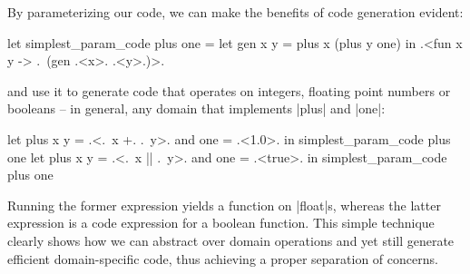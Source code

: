 \documentclass{elsart}
\begin{document}
By parameterizing our code, we can make the benefits of code generation
evident:

\begin{code}
let simplest_param_code plus one =
  let gen x y = plus x (plus y one) in
  .<fun x y -> .~(gen .<x>. .<y>.)>.
\end{code}
and use it to generate code that operates on integers, floating point
numbers or booleans -- in general, any domain that implements |plus|
and |one|:
\begin{code}
let plus x y = .<.~x +. .~y>. and one = .<1.0>. in
  simplest_param_code plus one
let plus x y = .<.~x || .~y>. and one = .<true>. in
  simplest_param_code plus one
\end{code}
Running the former expression yields a function on |float|s, whereas
the latter expression is a code expression for a boolean function.
This simple technique clearly shows how we can abstract over
domain operations and yet still generate efficient domain-specific code,
thus achieving a proper separation of concerns.
\end{document}
